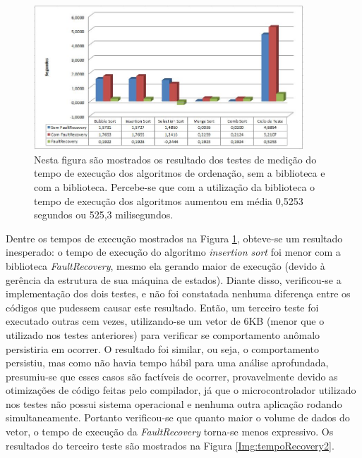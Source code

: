 \begin{figure}[h]
	\centering
	\includegraphics[width=0.9\textwidth]{figuras/tempoRecovery.jpg}
	\caption[Tempo de execução da biblioteca \textit{FaultRecovery}]{Nesta figura são mostrados os resultado dos testes de medição do tempo de execução dos algoritmos de ordenação, sem a biblioteca e com a biblioteca. Percebe-se que com a utilização da biblioteca o tempo de execução dos algoritmos aumentou em média 0,5253 segundos ou 525,3 milisegundos.}
	\label{Img:tempoRecovery}	
\end{figure}	
\newpage
Dentre os tempos de execução mostrados na Figura \ref{Img:tempoRecovery}, obteve-se um resultado inesperado: o tempo de execução do algoritmo \textit{insertion sort} foi menor com a biblioteca \textit{FaultRecovery}, mesmo ela gerando maior de execução (devido à gerência da estrutura de sua máquina de estados). Diante disso, verificou-se a implementação dos dois testes, e não foi constatada nenhuma diferença entre os códigos que pudessem causar este resultado. Então, um terceiro teste foi executado outras cem vezes, utilizando-se um vetor de 6KB (menor que o utilizado nos testes anteriores) para verificar se comportamento anômalo persistiria em ocorrer. O resultado foi similar, ou seja, o comportamento persistiu, mas como não havia tempo hábil para uma análise aprofundada, presumiu-se que esses casos são factíveis de ocorrer, provavelmente devido as otimizações de código feitas pelo compilador, já que o microcontrolador utilizado nos testes não possui sistema operacional e nenhuma outra aplicação rodando simultaneamente. Portanto verificou-se que quanto maior o volume de dados do vetor, o tempo de execução da \textit{FaultRecovery} torna-se menos expressivo. Os resultados do terceiro teste são mostrados na Figura \ref{Img:tempoRecovery2}.

